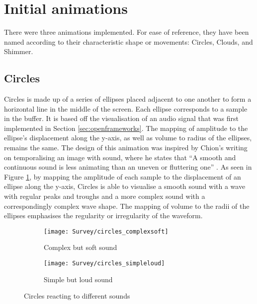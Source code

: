 \documentclass[../initial_thesis.tex]{subfiles}
\begin{document}
\section{Initial animations}
There were three animations implemented. For ease of reference, they have been named according to their characteristic shape or movements: Circles, Clouds, and Shimmer.

\subsection{Circles}
Circles is made up of a series of ellipses placed adjacent to one another to form a horizontal line in the middle of the screen. Each ellipse corresponds to a sample in the buffer. It is based off the visualisation of an audio signal that was first implemented in Section \ref{sec:openframeworks}. The mapping of amplitude to the ellipse's displacement along the y-axis, as well as volume to radius of the ellipses, remains the same. The design of this animation was inspired by Chion's writing on temporalising an image with sound, where he states that ``A smooth and continuous sound is less animating than an uneven or fluttering one'' \cite{Chion1994}. As seen in Figure \ref{fig:circles1}, by mapping the amplitude of each sample to the displacement of an ellipse along the y-axis, Circles is able to visualise a smooth sound with a wave with regular peaks and troughs and a more complex sound with a correspondingly complex wave shape. The mapping of volume to the radii of the ellipses emphasises the regularity or irregularity of the waveform.

\begin{figure}
  \begin{subfigure}{0.5\textwidth}
    \texttt{[image: Survey/circles\_complexsoft]}
    \caption{Complex but soft sound}
  \end{subfigure} 
  \begin{subfigure}{0.5\textwidth}
    \texttt{[image: Survey/circles\_simpleloud]}
    \caption{Simple but loud sound}
  \end{subfigure}
  \caption{Circles reacting to different sounds}
  \label{fig:circles1}
\end{figure}
\end{document}
